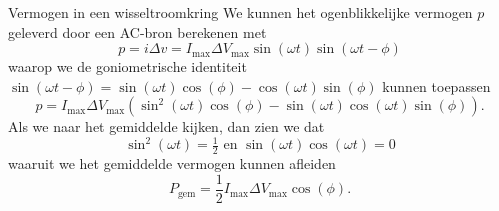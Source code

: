 \newpage


\begin{pro}{Vermogen in een wisseltroomkring}
    We kunnen het ogenblikkelijke vermogen $p$ geleverd door een AC-bron berekenen met
    \begin{equation*}
        p = i \Delta v = I_{\max}\Delta V_{\max}\sin(\omega t)\sin(\omega t - \phi) 
    \end{equation*} 
    waarop we de goniometrische identiteit $\sin(\omega t - \phi) = \sin(\omega t)\cos(\phi) - \cos(\omega t)\sin(\phi)$ kunnen toepassen 
    \begin{equation*}
        p = I_{\max}\Delta V_{\max}\left( \sin^2(\omega t)\cos(\phi) - \sin(\omega t)\cos(\omega t)\sin(\phi)\right).
    \end{equation*}
    Als we naar het gemiddelde kijken, dan zien we dat
    \begin{equation*}
        \sin^2(\omega t) = \tfrac{1}{2} \text{ en } \sin(\omega t)\cos(\omega t) = 0 
    \end{equation*} 
    waaruit we het gemiddelde vermogen kunnen afleiden
    \begin{equation*}
        P_{\text{gem}} = \frac{1}{2}I_{\max}\Delta V_{\max}\cos(\phi).
    \end{equation*}
    \vspace{-0.5cm}
\end{pro}

